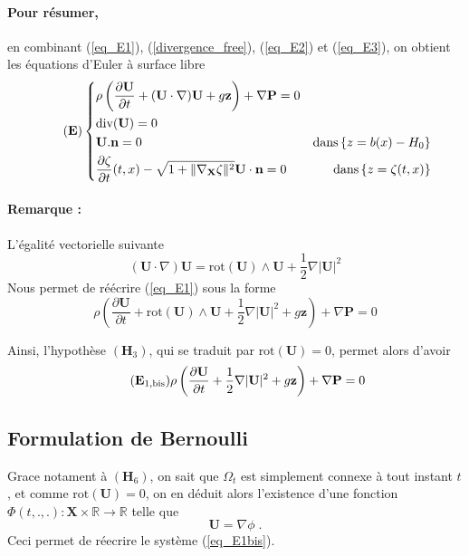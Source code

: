 \documentclass[12pt,a4paper]{article}
\newcommand{\rot}{\text{rot}}
\numberwithin{equation}{section}
\begin{document}
\paragraph{Pour résumer,} en combinant (\ref{eq_E1}), (\ref{divergence_free}), (\ref{eq_E2}) et (\ref{eq_E3}), on obtient les équations d'Euler à surface libre
\begin{equation} \tag{\textbf{E}}
    \left\{ 
    \begin{aligned}
        &\rho \left ( \frac{\partial \textbf{U}}{\partial t} + (\textbf{U}\cdot \nabla ) \textbf{U}+  g\textbf{z}  \right) + \nabla \textbf{P} = 0 & &  
        \\
        &\text{div}(\textbf{U}) = 0 & &  
        \\
        &\textbf{U}.\textbf{n} = 0 &\text{dans}\,\{z = b(x)-H_0\}& 
        \\
        &\frac{\partial \zeta}{\partial t}(t,x) - \sqrt{1+ \| \nabla_\textbf{X}\zeta\|^2} \textbf{U} \cdot \textbf{n} = 0 &\text{dans}\,\{z = \zeta(t,x)\} & 
    \end{aligned}
    \right.
\end{equation}
\paragraph{Remarque :} L'égalité vectorielle suivante
$$(\textbf{U}\cdot \nabla ) \textbf{U} = \rot(\textbf{U})\wedge \textbf{U} + \frac{1}{2}\nabla |\textbf{U}|^2$$
Nous permet de réécrire (\ref{eq_E1}) sous la forme
\begin{equation} \label{eq_E1bis}
    \rho \left( \frac{\partial \textbf{U}}{\partial t} +\rot(\textbf{U})\wedge \textbf{U} + \frac{1}{2}\nabla |\textbf{U}|^2+  g\textbf{z}  \right) + \nabla \textbf{P} = 0 
\end{equation}

Ainsi, l'hypothèse $(\textbf{H}_3)$, qui se traduit par $\rot(\textbf{U})=0$, permet alors d'avoir 
\begin{equation} \tag{$\textbf{E}_{1,\text{bis}}$} \label{eq_E1bis}
        \rho \left( \frac{\partial \textbf{U}}{\partial t} +\frac{1}{2}\nabla  |\textbf{U}|^2 +  g\textbf{z}\right) + \nabla \textbf{P} = 0 
\end{equation}

\subsection{Formulation de Bernoulli}
Grace notament à $(\textbf{H}_6)$, on sait que $\Omega_t$ est simplement connexe à tout instant $t$, et comme $\rot(\textbf{U}) = 0$, on en déduit alors l'existence d'une fonction $\Phi(t,.,.): \textbf{X}\times \mathbb{R} \rightarrow \mathbb{R}$ telle que $$\textbf{U} = \nabla \phi  \;.$$    Ceci permet de réecrire le système (\ref{eq_E1bis}).
\end{document}

